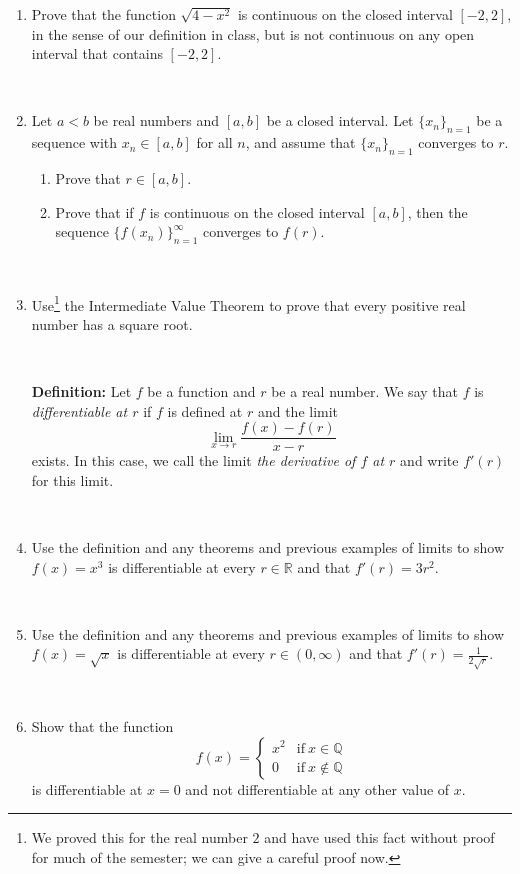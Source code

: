 \documentclass{amsart}
\def\R{\mathbb R}
\def\Q{\mathbb Q}
\def\ds{\displaystyle}
\begin{document}
\begin{enumerate}

\item Prove that the function $\sqrt{4-x^2}$ is continuous on the closed interval $[-2,2]$, in the sense of our definition in class, but is not continuous on any open interval that contains $[-2,2]$.

\

\item Let $a<b$ be real numbers and $[a,b]$ be a closed interval. Let $\{x_n\}_{n=1}$ be a sequence with $x_n\in[a,b]$ for all $n$, and assume that $\{x_n\}_{n=1}$ converges to $r$.
\begin{enumerate}
\item Prove that $r\in [a,b]$.
\item Prove that if $f$ is continuous on the closed interval $[a,b]$, then the sequence $\{f(x_n)\}_{n=1}^\infty$ converges to $f(r)$.
\end{enumerate}

\

\item Use\footnote{We proved this for the real number $2$ and have used this fact without proof for much of the semester; we can give a careful proof now.}  the Intermediate Value Theorem to prove that every positive real number has a square root.


\

\begin{framed}
\noindent \textbf{Definition:} Let $f$ be a function and $r$ be a real number. We say that $f$ is \emph{differentiable at $r$} if $f$ is defined at $r$ and the limit
\[ \lim_{x\to r} \frac{ f(x) - f(r) }{x-r}\]
exists. In this case, we call the limit \emph{the derivative of $f$ at $r$} and write $f'(r)$ for this limit.
\end{framed}

\

\item Use the definition and any theorems and previous examples of limits to show $f(x)= x^3$  is differentiable at every $r\in \R$ and that $f'(r) = 3r^2$.

\

\item Use the definition and any theorems and previous examples of limits to show $f(x)= \sqrt{x}$  is differentiable at every $r\in (0,\infty)$ and that $\ds f'(r) = \frac{1}{2\sqrt{r}}$.

\


\item Show that the function 
\[ f(x) = \begin{cases} x^2 & \text{if} \ x\in \Q \\ 0 & \text{if} \ x\notin \Q\end{cases} \]
is differentiable at $x=0$ and not differentiable at any other value of $x$.

\end{enumerate}
\end{document}
